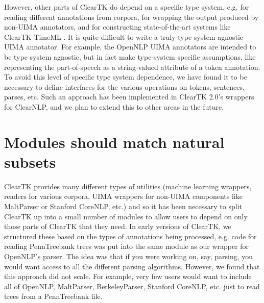 \documentclass[10pt, a4paper]{article}
\newcommand{\code}[1]{\texttt{\small #1}}
\begin{document}

However, other parts of ClearTK do depend on a specific type system, e.g. for reading different annotations from corpora, for wrapping the output produced by non-UIMA annotators, and for constructing state-of-the-art systems like ClearTK-TimeML \cite{bethard:2013:SemEval-2013}.
It is quite difficult to write a truly type-system agnostic UIMA annotator.
For example, the OpenNLP UIMA annotators are intended to be type system agnostic, but in fact make type-system specific assumptions, like representing the part-of-speech as a string-valued attribute of a token annotation.
To avoid this level of specific type system dependence, we have found it to be necessary to define interfaces for the various operations on tokens, sentences, parses, etc.
Such an approach has been implemented in ClearTK 2.0's wrappers for ClearNLP, and we plan to extend this to other areas in the future.


\section{Modules should match natural subsets}
ClearTK provides many different types of utilities (machine learning wrappers, readers for various corpora, UIMA wrappers for non-UIMA components like MaltParser or Stanford CoreNLP, etc.) and so it has been necessary to split ClearTK up into a small number of modules to allow users to depend on only those parts of ClearTK that they need.
In early versions of ClearTK, we structured these based on the types of annotations being processed, e.g. code for reading PennTreebank trees was put into the same module as our wrapper for OpenNLP's parser.
The idea was that if you were working on, say, parsing, you would want access to all the different parsing algorithms.
However, we found that this approach did not scale.
For example, very few users would want to include all of OpenNLP, MaltParser, BerkeleyParser, Stanford CoreNLP, etc. just to read trees from a PennTreebank file.
\end{document}
